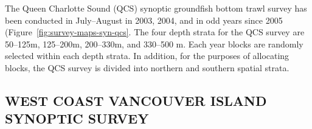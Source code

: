 \documentclass[11pt]{book}
\begin{document}
The Queen Charlotte Sound (QCS) synoptic groundfish bottom trawl survey has been conducted in July--August in 2003, 2004, and in odd years since 2005 (Figure~\ref{fig:survey-maps-syn-qcs}. The four depth strata for the QCS survey are 50--125m, 125--200m, 200--330m, and 330--500 m. Each year blocks are randomly selected within each depth strata. In addition, for the purposes of allocating blocks, the QCS survey is divided into northern and southern spatial strata.

\hypertarget{west-coast-vancouver-island-synoptic-survey}{%
\subsection{WEST COAST VANCOUVER ISLAND SYNOPTIC SURVEY}\label{west-coast-vancouver-island-synoptic-survey}}
\end{document}
